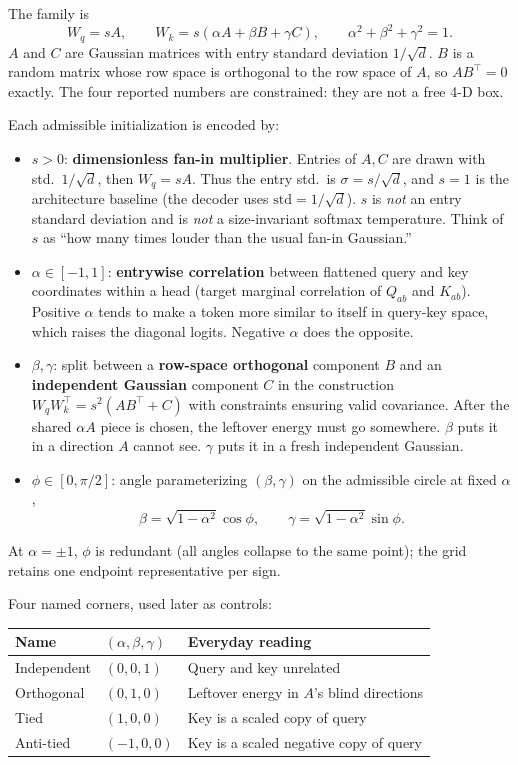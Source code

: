 \documentclass[11pt,a4paper]{report}
\begin{document}
The family is
\[
W_q = sA, \qquad W_k = s(\alpha A + \beta B + \gamma C),
\qquad \alpha^2+\beta^2+\gamma^2=1.
\]
$A$ and $C$ are Gaussian matrices with entry standard deviation $1/\sqrt{d}$. $B$ is a random matrix whose row space is orthogonal to the row space of $A$, so $AB^\top=0$ exactly. The four reported numbers are constrained: they are not a free 4-D box.

Each admissible initialization is encoded by:
\begin{itemize}[leftmargin=*]
  \item $s>0$: \textbf{dimensionless fan-in multiplier}. Entries of $A,C$ are drawn with std.\ $1/\sqrt{d}$, then $W_q=sA$. Thus the entry std.\ is $\sigma=s/\sqrt{d}$, and $s=1$ is the architecture baseline (the decoder uses $\mathrm{std}=1/\sqrt{d}$). $s$ is \emph{not} an entry standard deviation and is \emph{not} a size-invariant softmax temperature. Think of $s$ as ``how many times louder than the usual fan-in Gaussian.''
  \item $\alpha\in[-1,1]$: \textbf{entrywise correlation} between flattened query and key coordinates within a head (target marginal correlation of $Q_{ab}$ and $K_{ab}$). Positive $\alpha$ tends to make a token more similar to itself in query-key space, which raises the diagonal logits. Negative $\alpha$ does the opposite.
  \item $\beta,\gamma$: split between a \textbf{row-space orthogonal} component $B$ and an \textbf{independent Gaussian} component $C$ in the construction $W_q W_k^\top = s^2(AB^\top + C)$ with constraints ensuring valid covariance. After the shared $\alpha A$ piece is chosen, the leftover energy must go somewhere. $\beta$ puts it in a direction $A$ cannot see. $\gamma$ puts it in a fresh independent Gaussian.
  \item $\phi\in[0,\pi/2]$: angle parameterizing $(\beta,\gamma)$ on the admissible circle at fixed $\alpha$,
  \[
  \beta=\sqrt{1-\alpha^2}\cos\phi, \qquad \gamma=\sqrt{1-\alpha^2}\sin\phi.
  \]
\end{itemize}

At $\alpha=\pm 1$, $\phi$ is redundant (all angles collapse to the same point); the grid retains one endpoint representative per sign.

Four named corners, used later as controls:
\begin{center}
\begin{tabular}{lll}
\toprule
Name & $(\alpha,\beta,\gamma)$ & Everyday reading \\
\midrule
Independent & $(0,0,1)$ & Query and key unrelated \\
Orthogonal & $(0,1,0)$ & Leftover energy in $A$'s blind directions \\
Tied & $(1,0,0)$ & Key is a scaled copy of query \\
Anti-tied & $(-1,0,0)$ & Key is a scaled negative copy of query \\
\bottomrule
\end{tabular}
\end{center}
\end{document}
